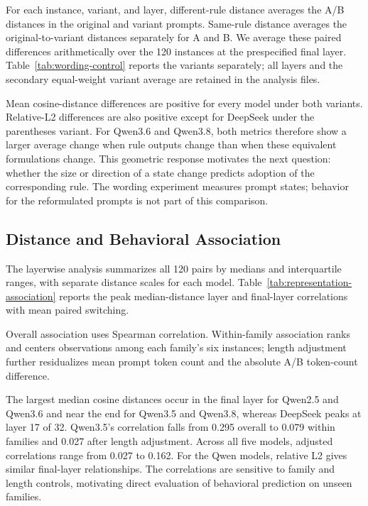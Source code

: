 \documentclass[acmsmall,screen,review,anonymous]{acmart}
\begin{document}
For each instance, variant, and layer, different-rule distance averages the A/B distances in the original and variant prompts.
Same-rule distance averages the original-to-variant distances separately for A and B.
We average these paired differences arithmetically over the 120 instances at the prespecified final layer.
Table~\ref{tab:wording-control} reports the variants separately; all layers and the secondary equal-weight variant average are retained in the analysis files.



Mean cosine-distance differences are positive for every model under both variants.
Relative-L2 differences are also positive except for DeepSeek under the parentheses variant.
For Qwen3.6 and Qwen3.8, both metrics therefore show a larger average change when rule outputs change than when these equivalent formulations change.
This geometric response motivates the next question: whether the size or direction of a state change predicts adoption of the corresponding rule.
The wording experiment measures prompt states; behavior for the reformulated prompts is not part of this comparison.

\subsection{Distance and Behavioral Association}
The layerwise analysis summarizes all 120 pairs by medians and interquartile ranges, with separate distance scales for each model.
Table~\ref{tab:representation-association} reports the peak median-distance layer and final-layer correlations with mean paired switching.

Overall association uses Spearman correlation.
Within-family association ranks and centers observations among each family's six instances; length adjustment further residualizes mean prompt token count and the absolute A/B token-count difference.




The largest median cosine distances occur in the final layer for Qwen2.5 and Qwen3.6 and near the end for Qwen3.5 and Qwen3.8, whereas DeepSeek peaks at layer 17 of 32.
Qwen3.5's correlation falls from 0.295 overall to 0.079 within families and 0.027 after length adjustment.
Across all five models, adjusted correlations range from 0.027 to 0.162.
For the Qwen models, relative L2 gives similar final-layer relationships.
The correlations are sensitive to family and length controls, motivating direct evaluation of behavioral prediction on unseen families.
\end{document}
